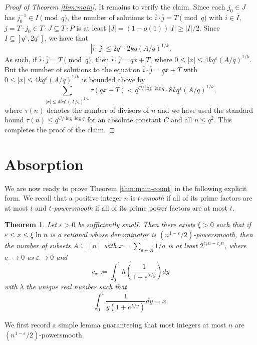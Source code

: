 \documentclass{daj}
\newtheorem{theorem}{Theorem}
\newcommand{\eps}{\varepsilon}
\newcommand{\ol}[1]{\overline{#1}}
\begin{document}
\begin{proof}[Proof of Theorem \ref{thm:main}]
    It remains to verify the claim. Since each $j_0\in J$ has $j_0^{-1}\in I \pmod q$, the number of solutions to $\ol{i} \cdot \ol{j} = T \pmod q$ with $i\in \ol{I}$, $j = T \cdot j_0 \in T \cdot J \subseteq T\cdot P$ is at least $|J| = (1-o(1))|I| \ge |I|/2$. 
Since $I \subseteq [q^{\eps}, 2q^{\eps}]$, we have that 
\[|\ol{i} \cdot \ol{j}| \le 2q^{\eps} \cdot 2kq(A/q)^{1/k}.\]
    As such, if $\ol{i} \cdot \ol{j} = T\pmod q$, then $\ol{i} \cdot \ol{j} = qx+T$, where $0\le |x| \le 4kq^{\eps} (A/q)^{1/k}$. But the number of solutions to the equation $\ol{i} \cdot \ol{j} = qx+T$ with $0\le |x| \le 4kq^{\eps} (A/q)^{1/k}$ is bounded above by
    \begin{equation*}
        \sum_{|x|\le 4kq^{\eps}(A/q)^{1/k}} \tau(qx+T) < q^{C/\log \log q} \cdot 8kq^{\eps}(A/q)^{1/k}, 
    \end{equation*} 
    where $\tau(n)$ denotes the number of divisors of $n$ and we have used the standard bound $\tau(n) \le q^{C/\log \log q}$ for an absolute constant $C$ and all $n\le q^2$. This completes the proof of the claim. 
\end{proof}


    
    
\section{Absorption}

We are now ready to prove Theorem \ref{thm:main-count} in the following explicit form. We recall that a positive integer $n$ is {\it $t$-smooth} if all of its prime factors are at most $t$ and {\it $t$-powersmooth} if all of its prime power factors are at most $t$. 

\begin{theorem}\label{thm:main-count-explicit}
    Let $\eps > 0$ be sufficiently small. Then there exists $\xi > 0$ such that if $\eps \le x \le \xi \ln n$ is a rational whose denominator is $(n^{1-\eps}/2)$-powersmooth, then the number of subsets $A\subseteq [n]$ with $x = \sum_{a\in A}1/a$ is at least $2^{c_x n - c_\eps n}$, where $c_\eps \to 0$ as $\eps \to 0$ and
    \[
        c_x := \int_{0}^{1}h\left(\frac{1}{1+e^{\lambda/y}}\right)dy
    \] 
    with $\lambda$ the unique real number such that 
    \[
        \int_{0}^{1}\frac{1}{y(1+e^{\lambda/y})}dy = x.
    \]
\end{theorem}

We first record a simple lemma guaranteeing that most integers at most $n$ are $(n^{1-\eps}/2)$-powersmooth. 
\end{document}
